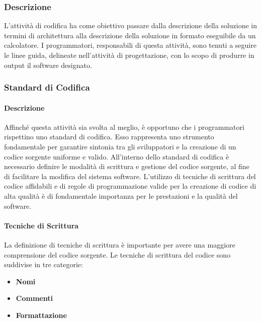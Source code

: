 \subsubsection{Descrizione}
L'attività di codifica ha come obiettivo passare dalla descrizione della soluzione in termini di architettura alla descrizione della soluzione in formato eseguibile da un calcolatore. I programmatori, responsabili di questa attività, sono tenuti a seguire le linee guida, delineate nell'attività di progettazione, con lo scopo di produrre in output il software designato. 

\subsubsection{Standard di Codifica}
\paragraph{Descrizione}
Affinché questa attività sia svolta al meglio, è opportuno che i programmatori rispettino uno standard di codifica.
Esso rappresenta uno strumento fondamentale per garantire sintonia tra gli sviluppatori e la creazione di un codice sorgente uniforme e valido.
All'interno dello standard di codifica è necessario definire le modalità di scrittura e gestione del codice sorgente, al fine di facilitare la modifica del sistema software.
L'utilizzo di tecniche di scrittura del codice affidabili e di regole di programmazione valide per la creazione di codice di alta qualità è di fondamentale importanza per le prestazioni e la qualità del software. 


\paragraph{Tecniche di Scrittura}
La definizione di tecniche di scrittura è importante per avere una maggiore comprensione del codice sorgente.
Le tecniche di scrittura del codice sono suddivise in tre categorie:
\begin{itemize} 
\item
\textbf{Nomi}
\item
\textbf{Commenti}
\item
\textbf{Formattazione}
\end{itemize}

